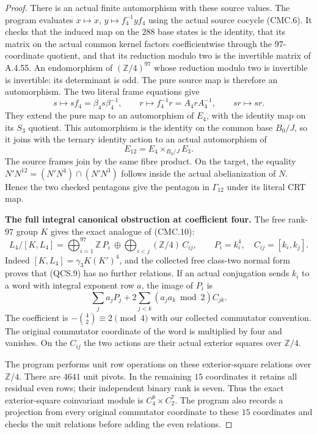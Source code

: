 \begin{proof}
There is an actual finite automorphism with these source values.
The program  evaluates
$x\mapsto x$, $y\mapsto f_4^{-1}yf_4$ using the actual source cocycle
(CMC.6).  It checks that the induced map on the $288$ base states is
the identity, that its matrix on the actual common kernel factors
coefficientwise through the $97$-coordinate quotient, and that its
reduction modulo two is the invertible matrix of A.4.55.  An endomorphism
of $(\mathbb Z/4)^{97}$ whose reduction modulo two is invertible is
invertible: its determinant is odd.  The pure source map is therefore
an automorphism.  The two literal frame equations give
\[
 s\longmapsto sf_4=\beta_4s\beta_4^{-1},\qquad
 r\longmapsto f_4^{-1}r=A_4rA_4^{-1},\qquad sr\longmapsto sr.
 \tag{QCS.7}
\]
They extend the pure map to an automorphism of $E_4$, with the identity
map on its $S_3$ quotient.  This automorphism is the identity on the
common base $B_0/J$, so it joins with the ternary identity action to an
actual automorphism of
\[
                E_{12}=E_4\mathop{\times}_{B_0/J}E_3.
 \tag{QCS.8}
\]
The source frames join by the same fibre product.  On the target,
the equality $N'N^{12}=(N'N^4)\cap(N'N^3)$ follows inside the actual
abelianization of $N$.  Hence the two checked pentagons give the
pentagon in $\Gamma_{12}$ under its literal CRT map.

\par\medskip\noindent\textbf{The full integral canonical obstruction at coefficient four.}
The free rank-$97$ group $K$ gives the exact analogue of (CMC.10):
\[
 L_4/[K,L_4]=
       \bigoplus_{i=1}^{97}\mathbb Z\,P_i
       \ \oplus\!
       \bigoplus_{i<j}(\mathbb Z/4)\,C_{ij},
 \qquad P_i=k_i^4,\quad C_{ij}=[k_i,k_j].
 \tag{QCS.9}
\]
Indeed $[K,L_4]=\gamma_3K(K')^4$, and the collected free class-two
normal form proves that (QCS.9) has no further relations.  If an actual
conjugation sends $k_i$ to a word with integral exponent row $a$, the
image of $P_i$ is
\[
 \sum_j a_jP_j+2\sum_{j<k}(a_ja_k\bmod2)C_{jk}.
 \tag{QCS.10}
\]
The coefficient is $-\binom42\equiv2\pmod4$ with our collected
commutator convention.  The original commutator coordinate of the
word is multiplied by four and vanishes.  On the $C_{ij}$ the two
actions are their actual exterior squares over $\mathbb Z/4$.

The program  performs
unit row operations on these exterior-square relations over
$\mathbb Z/4$.  There are $4641$ unit pivots.  In the remaining $15$
coordinates it retains all residual even rows; their independent
binary rank is seven.  Thus the exact exterior-square coinvariant
module is $C_4^8\times C_2^7$.  The program also records a projection
from every original commutator coordinate to these $15$ coordinates
and checks the unit relations before adding the even relations.


\end{proof}
